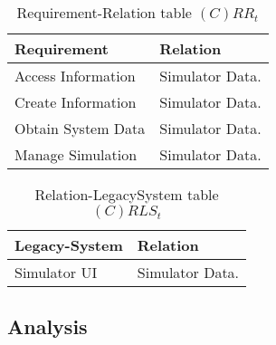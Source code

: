 \begin{table}[H]
	\centering
	\begin{tabular}{|p{4cm}|p{8cm}|}
			\hline
			\textbf{Requirement} & \textbf{Relation} \\
			\hline
			Access Information & Simulator Data. \\
			\hline
			Create Information & Simulator Data. \\
			\hline
			Obtain System Data & Simulator Data. \\
			\hline
			Manage Simulation & Simulator Data. \\
			\hline
		\end{tabular}
	\caption{Requirement-Relation table $(C)RR_t$}
	\label{tab:crrt}
\end{table}

\begin{table}[H]
	\centering
	\begin{tabular}{|p{4cm}|p{8cm}|}
			\hline
			\textbf{Legacy-System} & \textbf{Relation} \\
			\hline
			Simulator UI & Simulator Data. \\
			\hline
		\end{tabular}
	\caption{Relation-LegacySystem table $(C)RLS_t$}
	\label{tab:crlst}
\end{table}

\subsection{Analysis}

